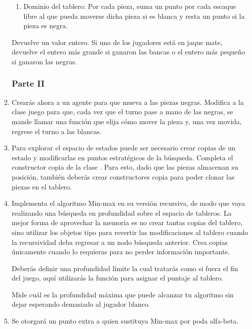 \begin{enumerate}
\begin{enumerate}
  \item Dominio del tablero:  Por cada pieza, suma un punto por cada escaque libre al que pueda moverse dicha pieza si es blanca y resta un punto si la pieza es negra.
 \end{enumerate}

 Devuelve un valor entero.  Si uno de los jugadores está en jaque mate, devuelve el entero más grande si ganaron las bancas o el entero más pequeño si ganaron las negras.
       
\subsubsection{Parte II}

 \item Crearás ahora a un agente para que mueva a las piezas negras.  Modifica a la clase juego para que, cada vez que el turno pase a mano de las negras, se mande llamar una función que elija cómo mover la pieza y, una vez movida, regrese el turno a las blancas.

 \item Para explorar el espacio de estados puede ser necesario crear copias de un estado y modificarlas en puntos estratégicos de la búsqueda.  Completa el constructor copia de la clase .  Para esto, dado que las piezas almacenan su posición, también deberás crear constructores copia para poder clonar las piezas en el tablero.

 \item Implementa el algoritmo Min-max en su versión recursiva, de modo que vaya realizando una búsqueda en profundidad sobre el espacio de tableros.  La mejor forma de aprovechar la memoria es no crear tantas copias del tablero, sino utilizar los objetos tipo  para revertir las modificaciones al tablero cuando la recursividad deba regresar a un nodo búsqueda anterior.  Crea copias únicamente cuando lo requieras para no perder información importante.

 Deberás definir una profundidad límite la cual tratarás como si fuera el fin del juego, aquí utilizarás la función  para asignar el puntaje al tablero.

 Mide cuál es la profundidad máxima que puede alcanzar tu algoritmo sin dejar esperando demasiado al jugador blanco.

 \item Se otorgará un punto extra a quien sustituya Min-max por poda alfa-beta.
\end{enumerate}
